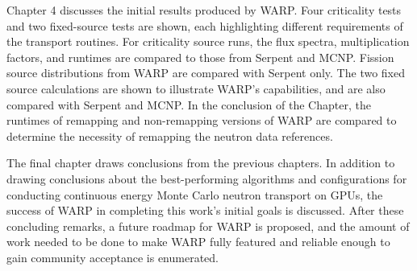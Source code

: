 Chapter 4 discusses the initial results produced by WARP.  Four criticality tests and two fixed-source tests are shown, each highlighting different requirements of the transport routines.  For criticality source runs, the flux spectra, multiplication factors, and runtimes are compared to those from Serpent and MCNP.  Fission source distributions from WARP are compared with Serpent only.  The two fixed source calculations are shown to illustrate WARP's capabilities, and are also compared with Serpent and MCNP.  In the conclusion of the Chapter, the runtimes of remapping and non-remapping versions of WARP are compared to determine the necessity of remapping the neutron data references.

The final chapter draws conclusions from the previous chapters.  In addition to drawing conclusions about the best-performing algorithms and configurations for conducting continuous energy Monte Carlo neutron transport on GPUs, the success of WARP in completing this work's initial goals is discussed.  After these concluding remarks, a future roadmap for WARP is proposed, and the amount of work needed to be done to make WARP fully featured and reliable enough to gain community acceptance is enumerated.





